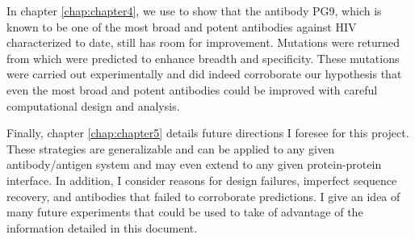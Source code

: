 In chapter \ref{chap:chapter4}, we use \rosettadesign to show that the antibody PG9, which is known to be one of the most broad and potent antibodies against HIV characterized to date, still has room for improvement. Mutations were returned from \rosettadesign which were predicted to enhance breadth and specificity. These mutations were carried out experimentally and did indeed corroborate our hypothesis that even the most broad and potent antibodies could be improved with careful computational design and analysis.

Finally, chapter \ref{chap:chapter5} details future directions I foresee for this project. These strategies are generalizable and can be applied to any given antibody/antigen system and may even extend to any given protein-protein interface. In addition, I consider reasons for design failures, imperfect sequence recovery, and antibodies that failed to corroborate \silico predictions. I give an idea of many future experiments that could be used to take of advantage of the information detailed in this document.